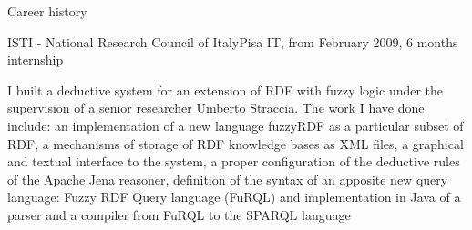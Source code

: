 \documentclass{resume}
\begin{document}
\begin{rSection}{Career history}
    \begin{rSubsection}{ISTI - National Research Council of Italy}{Pisa IT, from February 2009, 6 months internship}{}{}
      \item[]
	I built a deductive system for an extension of RDF with fuzzy logic under the supervision of a senior researcher Umberto Straccia.
	The work I have done include:
	an implementation of a new language fuzzyRDF as a particular subset of RDF,
        a mechanisms of storage of RDF knowledge bases as XML files,
        a graphical and textual interface to the system,
	a proper configuration of the deductive rules of the Apache Jena reasoner,
        definition of the syntax of an apposite new query language: Fuzzy RDF Query language (FuRQL)
	and implementation in Java of a parser and a compiler from FuRQL to the SPARQL language \\ 
    \end{rSubsection}
  \end{rSection}
\end{document}
